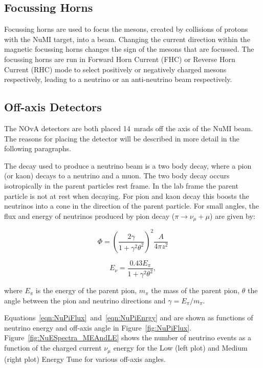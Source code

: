 \subsection{Focussing Horns}

Focussing horns are used to focus the mesons, created by collisions of
protons with the NuMI target, into a beam. Changing the current
direction within the magnetic focussing horns changes the sign
of the mesons that are focussed. The focussing horns are run in
Forward Horn Current (FHC) or Reverse Horn Current (RHC)
mode to select positively or negatively charged mesons
respectively, leading to a neutrino or an anti-neutrino beam respectively. 


\subsection{Off-axis Detectors}

The NOvA detectors are both placed 14~mrads off the axis of the NuMI
beam.
The reasons for placing the detector will be described
in more detail in the following paragraphs. 

The decay used to produce a neutrino beam is a two body decay, where a
pion (or kaon) decays to a neutrino and a muon. The two body decay 
occurs isotropically in the parent particles rest frame. 
In the lab frame the parent particle is not at rest when decaying. For
pion and kaon decay this boosts the neutrinos into a cone in the
direction of the parent particle.
For small angles, the flux and energy of neutrinos produced by pion
decay ($\pi \rightarrow \nu_{\mu} + \mu$) are given by:

\begin{equation}
\Phi = \left( \dfrac{2\gamma}{1+\gamma^2 \theta^2} \right)^2 \dfrac{A}{4\pi z^2}
\label{eqn:NuPiFlux}
\end{equation}

\begin{equation}
E_{\nu} = \dfrac{0.43E_{\pi}}{1+\gamma^2\theta^2},
\label{eqn:NuPiEnrgy}
\end{equation}

where $E_{\pi}$ is the energy of the parent pion, $m_{\pi}$ the mass of the
parent pion, $\theta$ the angle between the pion and neutrino
directions and $\gamma = E_{\pi}/m_{\pi}$.

Equations~\ref{eqn:NuPiFlux}~and~\ref{eqn:NuPiEnrgy} and are shown as 
functions of neutrino energy and off-axis angle in
Figure~\ref{fig:NuPiFlux}.
Figure~\ref{fig:NuESpectra_MEAndLE} shows the number of neutrino
events as a function of the
charged current $\nu_{\mu}$ energy for the Low (left plot) and
Medium (right plot) Energy Tune for various off-axis angles. 

